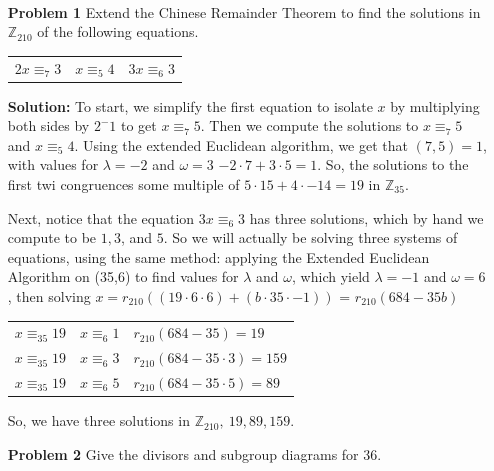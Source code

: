 \documentclass[letterpaper]{article}
\newcommand{\Integers}{\mathbb{Z}}
\begin{document}
 \\
\begin{itemize}
    \item[\textbf{Problem 1}] Extend the Chinese Remainder Theorem to find the solutions in \(\Integers_{210}\) of the following equations.
          \begin{center}
              \begin{tabular}{ p{3cm} p{3cm} p{3cm} }
                  \(2x \equiv_{7} 3 \) & \(x \equiv_{5} 4\) & \(3x \equiv_{6} 3\)
              \end{tabular}
          \end{center}

          \textbf{Solution:} To start, we simplify the first equation to isolate \(x\) by multiplying both sides by \(2^-1\) to get \(x \equiv_{7} 5 \). Then we compute the solutions to \(x \equiv_{7} 5 \) and \(x \equiv_{5} 4\). Using the extended Euclidean algorithm, we get that \((7,5) = 1\), with values for \(\lambda = -2\) and \(\omega = 3\) \(-2\cdot 7 + 3\cdot 5 = 1\). So, the solutions to the first twi congruences some multiple of \(5\cdot 15 + 4 \cdot - 14 = 19\) in \(\Integers_{35}\).

          Next, notice that the equation \(3x \equiv_{6} 3\) has three solutions, which by hand we compute to be  \(1, 3\), and \(5\). So we will actually be solving three systems of equations, using the same method: applying the Extended Euclidean Algorithm on (35,6) to find values for \(\lambda\) and \(\omega\), which yield \(\lambda = -1 \) and \(\omega = 6\), then solving \(x = r_{210}( (19 \cdot 6 \cdot 6 )  + (b \cdot 35 \cdot -1 ))\) = \(r_{210}(684 - 35b)\)
          \begin{center}
              \begin{tabular}{ p{2cm}  p{2cm} p{4cm}}
                  \(x \equiv_{35} 19 \)  & \(x \equiv_{6} 1\) & \(r_{210}(684 - 35) = 19\)         \\
                  \(x \equiv_{35} 19  \) & \(x \equiv_{6} 3\) & \(r_{210}(684 - 35\cdot 3) = 159\) \\
                  \(x \equiv_{35} 19  \) & \(x \equiv_{6} 5\) & \(r_{210}(684 - 35\cdot 5) = 89\)
              \end{tabular}
          \end{center}
          So, we have three solutions in \(\Integers_{210},\ 19, 89, 159\).

    \item[\textbf{Problem 2}] Give the divisors and subgroup diagrams for 36.
          \begin{center}


\end{center}
\end{itemize}
\end{document}
